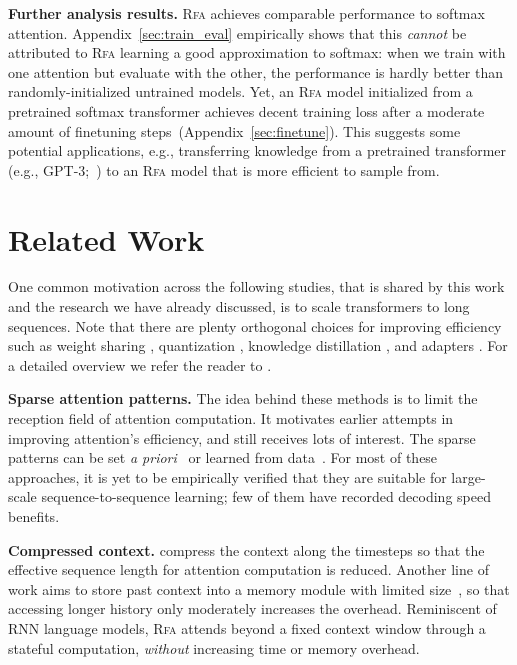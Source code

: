 \textbf{Further analysis results.}
\textsc{Rfa} achieves comparable performance to softmax attention.
Appendix~\ref{sec:train_eval} empirically shows that this \emph{cannot} be attributed to 
\textsc{Rfa} learning a good approximation to softmax: when we train with one attention but evaluate with the other, the performance is hardly better than randomly-initialized untrained models. Yet, an \textsc{Rfa} model initialized from a pretrained softmax transformer achieves decent training loss after a moderate amount of finetuning steps~(Appendix~\ref{sec:finetune}).
This suggests some potential applications, e.g., transferring knowledge from a pretrained transformer (e.g., GPT-3;~\citealp{brown2020language})
to an \textsc{Rfa} model that is more efficient to sample from. 

\section{Related Work} One common motivation across the following studies, that is shared by this work and the research we have already discussed, is to scale transformers to long sequences. Note that there are plenty orthogonal choices for improving efficiency such as weight sharing \citep{dehghani2018universal}, quantization \citep{shen2020}, knowledge distillation \citep{Sanh2019DistilBERTAD}, and adapters \citep{pmlr-v97-houlsby19a}. For a detailed overview we refer the reader to \cite{tay2020}.

\textbf{Sparse attention patterns.} The idea behind these methods is to limit the reception field of attention computation. It motivates earlier attempts in improving attention's efficiency, and still receives lots of interest. The sparse patterns can be set \textit{a priori}~\citep[\emph{inter alia}]{liu2018generating,qiu2019blockwise,ho2020axial,you2020hard} or learned from data~\citep[\emph{inter alia}]{sukhbaatar2019adaptive,roy2020efficient}. For most of these approaches, it is yet to be empirically verified that they are suitable for large-scale sequence-to-sequence learning; few of them have recorded decoding speed benefits.

\textbf{Compressed context.}
\citet{wang2020linformer} compress the context along the timesteps so that the effective sequence length for attention computation is reduced. Another line of work aims to store past context into a memory module with limited size~\citep[\emph{inter alia}]{lee2019set,ainslie2020etc,Rae2020Compressive}, so that accessing longer history only moderately increases the overhead. Reminiscent of RNN language models,
\textsc{Rfa} attends beyond a fixed context window through a stateful computation, \emph{without} increasing time or memory overhead.

